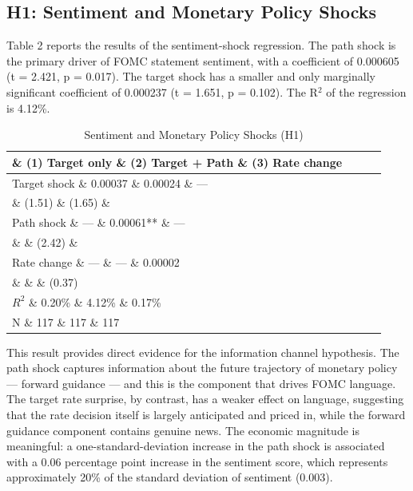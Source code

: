 \subsection{H1: Sentiment and Monetary Policy Shocks}

Table 2 reports the results of the sentiment-shock regression. The path shock is the primary driver of FOMC statement sentiment, with a coefficient of 0.000605 (t = 2.421, p = 0.017). The target shock has a smaller and only marginally significant coefficient of 0.000237 (t = 1.651, p = 0.102). The R$^2$ of the regression is 4.12\%.


\begin{table}[htbp]
\centering
\caption{Sentiment and Monetary Policy Shocks (H1)}
\label{tab:h1}
\begin{tabular}{lccc}
\toprule
 \& (1) Target only \& (2) Target + Path \& (3) Rate change \\
\midrule
Target shock \& 0.00037 \& 0.00024 \& --- \\
 \& (1.51) \& (1.65) \& \\
Path shock \& --- \& 0.00061** \& --- \\
 \& \& (2.42) \& \\
Rate change \& --- \& --- \& 0.00002 \\
 \& \& \& (0.37) \\
\midrule
$R^2$ \& 0.20\% \& 4.12\% \& 0.17\% \\
N \& 117 \& 117 \& 117 \\
\bottomrule
\end{tabular}
\par\vspace{2pt}{\footnotesize Newey-West HAC standard errors with lag=4. t-statistics in parentheses. ** $p < 0.05$, * $p < 0.10$.}
\end{table}


This result provides direct evidence for the information channel hypothesis. The path shock captures information about the future trajectory of monetary policy --- forward guidance --- and this is the component that drives FOMC language. The target rate surprise, by contrast, has a weaker effect on language, suggesting that the rate decision itself is largely anticipated and priced in, while the forward guidance component contains genuine news. The economic magnitude is meaningful: a one-standard-deviation increase in the path shock is associated with a 0.06 percentage point increase in the sentiment score, which represents approximately 20\% of the standard deviation of sentiment (0.003).


